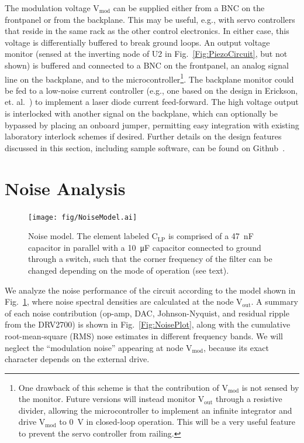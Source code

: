 \documentclass[aip,rsi,reprint]{revtex4-1} %
\begin{document}
The modulation voltage $\text{V}_\text{mod}$ can be supplied either from a BNC on the frontpanel or from the backplane.
This may be useful, e.g., with servo controllers that reside in the same rack as the other control electronics.
In either case, this voltage is differentially buffered to break ground loops.
An output voltage monitor (sensed at the inverting node of U2 in Fig.~\ref{Fig:PiezoCircuit}, but not shown) is buffered and connected to a BNC on the frontpanel, an analog signal line on the backplane, and to the microcontroller\footnote{One drawback of this scheme is that the contribution of $\text{V}_\text{mod}$ is not sensed by the monitor. Future versions will instead monitor $\text{V}_\text{out}$ through a resistive divider, allowing the microcontroller to implement an infinite integrator and drive $\text{V}_\text{mod}$ to \SI{0}{\volt} in closed-loop operation. This will be a very useful feature to prevent the servo controller from railing.}.
The backplane monitor could be fed to a low-noise current controller (e.g., one based on the design in Erickson, et. al.~\cite{Erickson2008a}) to implement a laser diode current feed-forward.
The high voltage output is interlocked with another signal on the backplane, which can optionally be bypassed by placing an onboard jumper, permitting easy integration with existing laboratory interlock schemes if desired.
Further details on the design features discussed in this section, including sample software, can be found on Github~\cite{PiezoDesignFiles}.

\section{Noise Analysis}
\label{Sec:NoiseAnalysis}

\begin{figure}[t]
\texttt{[image: fig/NoiseModel.ai]}
\caption{Noise model. The element labeled $\text{C}_\text{LP}$ is comprised of a \SI{47}{\nano\farad} capacitor in parallel with a \SI{10}{\micro\farad} capacitor connected to ground through a switch, such that the corner frequency of the filter can be changed depending on the mode of operation  (see text). %
\label{Fig:NoiseModel}}
\end{figure}

We analyze the noise performance of the circuit according to the model shown in Fig.~\ref{Fig:NoiseModel}, where noise spectral densities are calculated at the node $\text{V}_\text{out}$.
A summary of each noise contribution (op-amp, DAC, Johnson-Nyquist, and residual ripple from the DRV2700) is shown in Fig.~\ref{Fig:NoisePlot}, along with the cumulative root-mean-square (RMS) nose estimates in different frequency bands.
We will neglect the ``modulation noise'' appearing at node $\text{V}_\text{mod}$, because its exact character depends on the external drive.
\end{document}
